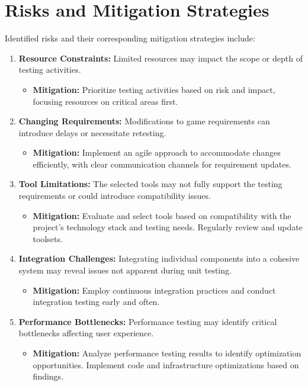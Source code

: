\documentclass[12pt]{article}
\begin{document}
\section{Risks and Mitigation Strategies}
Identified risks and their corresponding mitigation strategies include:
\begin{enumerate}
    \item \textbf{Resource Constraints:} Limited resources may impact the scope or depth of testing activities.
    \begin{itemize}
        \item \textbf{Mitigation:} Prioritize testing activities based on risk and impact, focusing resources on critical areas first.
    \end{itemize}
    \item \textbf{Changing Requirements:} Modifications to game requirements can introduce delays or necessitate retesting.
    \begin{itemize}
        \item \textbf{Mitigation:} Implement an agile approach to accommodate changes efficiently, with clear communication channels for requirement updates.
    \end{itemize}
    \item \textbf{Tool Limitations:} The selected tools may not fully support the testing requirements or could introduce compatibility issues.
    \begin{itemize}
        \item \textbf{Mitigation:} Evaluate and select tools based on compatibility with the project's technology stack and testing needs. Regularly review and update toolsets.
    \end{itemize}
    \item \textbf{Integration Challenges:} Integrating individual components into a cohesive system may reveal issues not apparent during unit testing.
    \begin{itemize}
        \item \textbf{Mitigation:} Employ continuous integration practices and conduct integration testing early and often.
    \end{itemize}
    \item \textbf{Performance Bottlenecks:} Performance testing may identify critical bottlenecks affecting user experience.
    \begin{itemize}
        \item \textbf{Mitigation:} Analyze performance testing results to identify optimization opportunities. Implement code and infrastructure optimizations based on findings.
    \end{itemize}
\end{enumerate}
\end{document}
